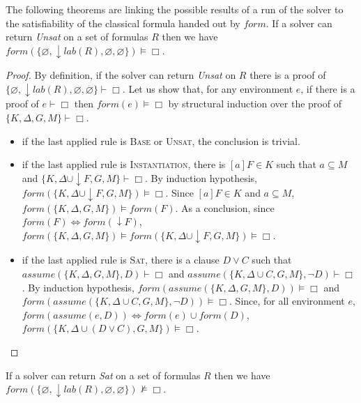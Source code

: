 \documentclass[a4paper,11pt]{article}
\newcommand{\F}{\mathit{form}}
\newcommand{\T}{\mathit{lab}}
\newcommand{\A}{\mathit{assume}}
\begin{document}
The following theorems are linking the possible results of a run of the solver to the satisfiability
of the classical formula handed out by $\F$.
{\theorem\label{pred1} If a solver can return \emph{Unsat} on a set of formulas $R$ then we have
$\F(\{\varnothing,\downarrow\T(R),\varnothing,\varnothing\})\vDash\Box$.}
\begin{proof}
By definition, if the solver can return \emph{Unsat} on $R$ there is a proof of
$\{\varnothing,\downarrow\T(R),\varnothing,\varnothing\}\vdash\Box$. Let us show that,
for any environment $e$, if there is a proof of $e\vdash\Box$ then $\F(e)\vDash\Box$ by structural
induction over the proof of $\{K,\Delta,G,M\}\vdash\Box$.
\begin{itemize}
 \item if the last applied rule is \textsc{Base} or \textsc{Unsat}, the conclusion is trivial.
 \item if the last applied rule is \textsc{Instantiation}, there is $[a]F\in K$ such that
$a\subseteq M$ and $\{K,\Delta\cup\downarrow F,G,M\}\vdash\Box$. By induction hypothesis,
$\F(\{K,\Delta\cup\downarrow F,G,M\})\vDash\Box$. Since $[a]F\in K$ and $a\subseteq M$,
$\F(\{K,\Delta,G,M\})\vDash\F(F)$. As a conclusion, since $\F(F)\Leftrightarrow\F(\downarrow F)$,
$\F(\{K,\Delta,G,M\})\vDash\F(\{K,\Delta\cup\downarrow F,G,M\})\vDash\Box$.
 \item if the last applied rule is \textsc{Sat}, there is a clause $D\vee C$ such that
$\A(\{K,\Delta,G,M\},D)\vdash\Box$ and $\A(\{K,\Delta\cup C,G,M\},\neg D)\vdash\Box$.
By induction hypothesis, $\F(\A(\{K,\Delta,G,M\},D))\vDash\Box$ and
$\F(\A(\{K,\Delta\cup C,G,M\},\neg D))\vDash\Box$. Since, for all environment $e$,
$\F(\A(e,D))\Leftrightarrow\F(e)\cup\F(D)$,
$\F(\{K,\Delta\cup(D\vee C),G,M\})\vDash\Box$.
\end{itemize}
\end{proof}
{\theorem\label{pred2} If a solver can return \emph{Sat} on a set of formulas $R$ then we have
$\F(\{\varnothing,\downarrow\T(R),\varnothing,\varnothing\})\nvDash\Box$.}
\end{document}
